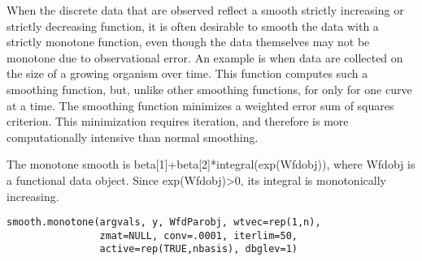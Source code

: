 \documentclass{article}
\begin{document}
\begin{Description}\relax
When the discrete data that are observed reflect a smooth strictly
increasing or strictly decreasing function, it is often desirable to
smooth the data with a strictly monotone function, even though the
data themselves may not be monotone due to observational error.  An
example is when data are collected on the size of a growing organism
over time.  This function computes such a smoothing function, but,
unlike other smoothing functions, for only for one curve at a time.
The smoothing function minimizes a weighted error sum of squares
criterion.  This minimization requires iteration, and therefore is
more computationally intensive than normal smoothing.

The monotone smooth is beta[1]+beta[2]*integral(exp(Wfdobj)), where
Wfdobj is a functional data object.  Since exp(Wfdobj)>0, its integral
is monotonically increasing.
\end{Description}
\begin{Usage}
\begin{verbatim}
smooth.monotone(argvals, y, WfdParobj, wtvec=rep(1,n),
                zmat=NULL, conv=.0001, iterlim=50,
                active=rep(TRUE,nbasis), dbglev=1)
\end{verbatim}
\end{Usage}
\end{document}
